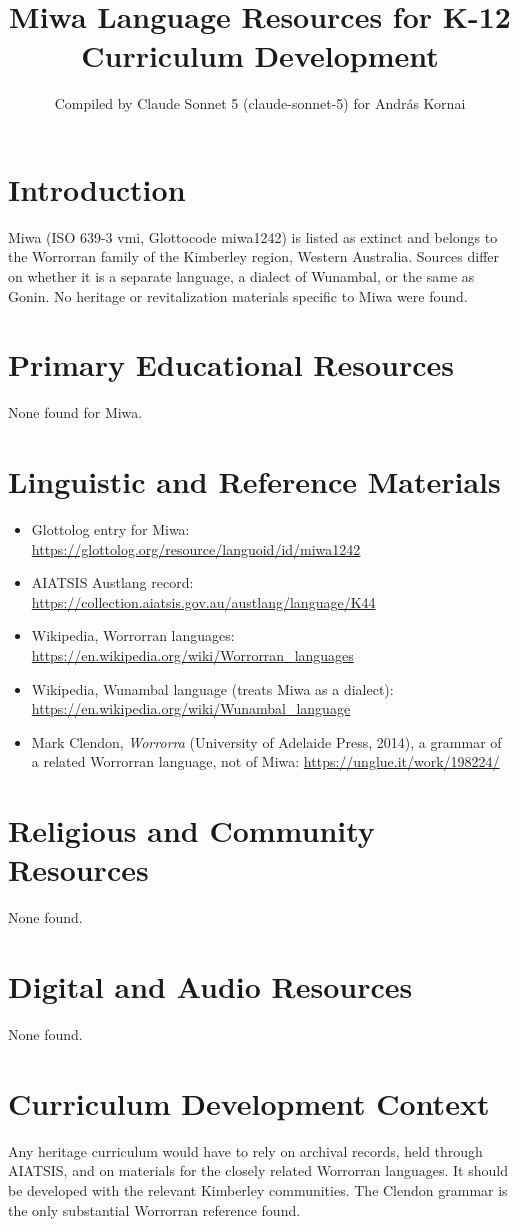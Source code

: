 \documentclass[12pt]{article}
\title{Miwa Language Resources for K-12 Curriculum Development}
\author{Compiled by Claude Sonnet 5 (claude-sonnet-5) for Andr\'as Kornai}
\date{}
\begin{document}
\maketitle
\section{Introduction}
Miwa (ISO 639-3 vmi, Glottocode miwa1242) is listed as extinct and belongs to the Worrorran family of the Kimberley region, Western Australia. Sources differ on whether it is a separate language, a dialect of Wunambal, or the same as Gonin. No heritage or revitalization materials specific to Miwa were found.
\section{Primary Educational Resources}
None found for Miwa.
\section{Linguistic and Reference Materials}
\begin{itemize}
\item Glottolog entry for Miwa: \url{https://glottolog.org/resource/languoid/id/miwa1242}
\item AIATSIS Austlang record: \url{https://collection.aiatsis.gov.au/austlang/language/K44}
\item Wikipedia, Worrorran languages: \url{https://en.wikipedia.org/wiki/Worrorran_languages}
\item Wikipedia, Wunambal language (treats Miwa as a dialect): \url{https://en.wikipedia.org/wiki/Wunambal_language}
\item Mark Clendon, \emph{Worrorra} (University of Adelaide Press, 2014), a grammar of a related Worrorran language, not of Miwa: \url{https://unglue.it/work/198224/}
\end{itemize}
\section{Religious and Community Resources}
None found.
\section{Digital and Audio Resources}
None found.
\section{Curriculum Development Context}
Any heritage curriculum would have to rely on archival records, held through AIATSIS, and on materials for the closely related Worrorran languages. It should be developed with the relevant Kimberley communities. The Clendon grammar is the only substantial Worrorran reference found.
\end{document}

